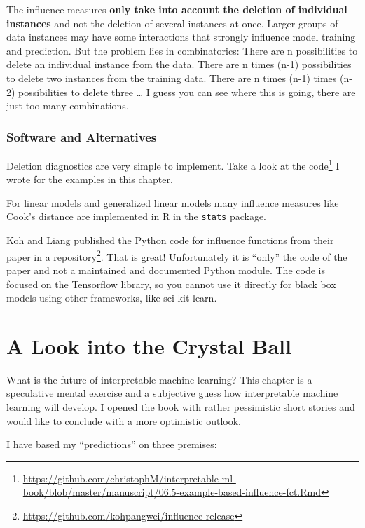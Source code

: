 \documentclass[
  12pt,
]{krantz}
\renewcommand{\href}[2]{#2\footnote{\url{#1}}}
\begin{document}
The influence measures \textbf{only take into account the deletion of individual instances} and not the deletion of several instances at once.
Larger groups of data instances may have some interactions that strongly influence model training and prediction.
But the problem lies in combinatorics:
There are n possibilities to delete an individual instance from the data.
There are n times (n-1) possibilities to delete two instances from the training data.
There are n times (n-1) times (n-2) possibilities to delete three \ldots{}
I guess you can see where this is going, there are just too many combinations.

\hypertarget{software-and-alternatives-6}{%
\subsection{Software and Alternatives}\label{software-and-alternatives-6}}

Deletion diagnostics are very simple to implement.
Take a look at \href{https://github.com/christophM/interpretable-ml-book/blob/master/manuscript/06.5-example-based-influence-fct.Rmd}{the code} I wrote for the examples in this chapter.

For linear models and generalized linear models many influence measures like Cook's distance are implemented in R in the \texttt{stats} package.

Koh and Liang published the Python code for influence functions from their paper \href{https://github.com/kohpangwei/influence-release}{in a repository}.
That is great!
Unfortunately it is ``only'' the code of the paper and not a maintained and documented Python module.
The code is focused on the Tensorflow library, so you cannot use it directly for black box models using other frameworks, like sci-kit learn.

\hypertarget{future}{%
\chapter{A Look into the Crystal Ball}\label{future}}

What is the future of interpretable machine learning?
This chapter is a speculative mental exercise and a subjective guess how interpretable machine learning will develop.
I opened the book with rather pessimistic \protect\hyperlink{storytime}{short stories} and would like to conclude with a more optimistic outlook.

I have based my ``predictions'' on three premises:
\end{document}
